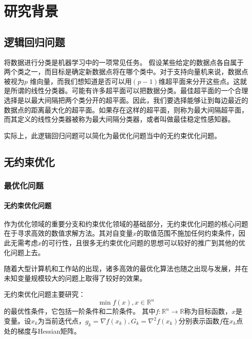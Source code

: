 
\chapter{\hei \textbf{研究背景}}

\section{\hei 逻辑回归问题}

将数据进行分类是机器学习中的一项常见任务。 假设某些给定的数据点各自属于两个类之一，而目标是确定新数据点将在哪个类中。对于支持向量机来说，数据点被视为$ p$ 维向量，而我们想知道是否可以用$(p-1)$维超平面来分开这些点。这就是所谓的线性分类器。可能有许多超平面可以把数据分类。最佳超平面的一个合理选择是以最大间隔把两个类分开的超平面。因此，我们要选择能够让到每边最近的数据点的距离最大化的超平面。如果存在这样的超平面，则称为最大间隔超平面，而其定义的线性分类器被称为最大间隔分类器，或者叫做最佳稳定性感知器。


{\hei 实际上，此逻辑回归问题可以简化为最优化问题当中的无约束优化问题。}


\section{\hei 无约束优化}
\subsection{最优化问题}



 \subsubsection{无约束优化问题}

作为优化领域的重要分支和约束优化领域的基础部分，无约束优化问题的核心问题在于寻求高效的数值求解方法。其对自变量$ x $的取值范围不施加任何约束条件，因此无需考虑$ x $的可行性，且很多无约束优化问题的思想可以较好的推广到其他的优化问题上去。

随着大型计算机和工作站的出现，诸多高效的最优化算法也随之出现与发展，并在未知变量规模较大的问题上取得了较好的效果。

无约束优化问题主要研究：
\begin{equation}\label{min}
	\min f(x) ,x \in \mathbb{R}^{n}
\end{equation}
的最优性条件，它包括一阶条件和二阶条件。
其中$ f: \mathbb{R}^{n} \rightarrow \mathbb{R} $称为目标函数，$ x $是变量。设$ x_{k} $为当前迭代点，$ g_{k}=\nabla f(x_{k}), G_{k}=\nabla^{2}f(x_{k})$分别表示函数$ f $在$ x_{k} $点处的梯度与Hessian矩阵。


